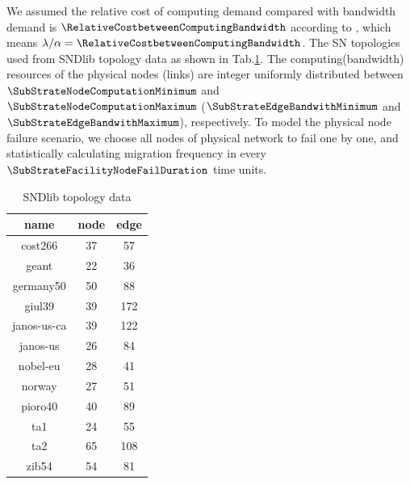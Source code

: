 We assumed the relative cost of computing demand  compared with bandwidth demand is $\RelativeCostbetweenComputingBandwidth$ according to  \cite{armbrust2009above,yu2010survivable}, which means $\lambda/\alpha=\RelativeCostbetweenComputingBandwidth$.
The SN topologies used from SNDlib topology data \cite{orlowski2010sndlib} as shown in Tab.\ref{tab:SNDlibTopo}.
The computing(bandwidth) resources of the physical nodes (links) are integer uniformly distributed between $\SubStrateNodeComputationMinimum$ and $\SubStrateNodeComputationMaximum$ ($\SubStrateEdgeBandwithMinimum$ and $\SubStrateEdgeBandwithMaximum$), respectively. To model the physical node failure scenario, we choose all nodes of physical network to fail one by one, and statistically calculating migration frequency in every $\SubStrateFacilityNodeFailDuration$ time units.
\begin{table}[htb]
\centering
\caption{SNDlib topology data}\label{tab:SNDlibTopo}
\begin{tabular}{|c|c|c|}
  \hline
  name & node & edge \\
  \hline
  cost266& 37& 57\\
  geant& 22& 36\\
  germany50& 50& 88\\
  giul39& 39& 172\\
  janos-us-ca& 39& 122\\
  janos-us& 26& 84\\
  nobel-eu& 28& 41\\
  norway& 27& 51\\
  pioro40& 40& 89\\
  ta1& 24& 55\\
  ta2& 65& 108\\
  zib54& 54& 81\\
  \hline

\end{tabular}
\end{table}


